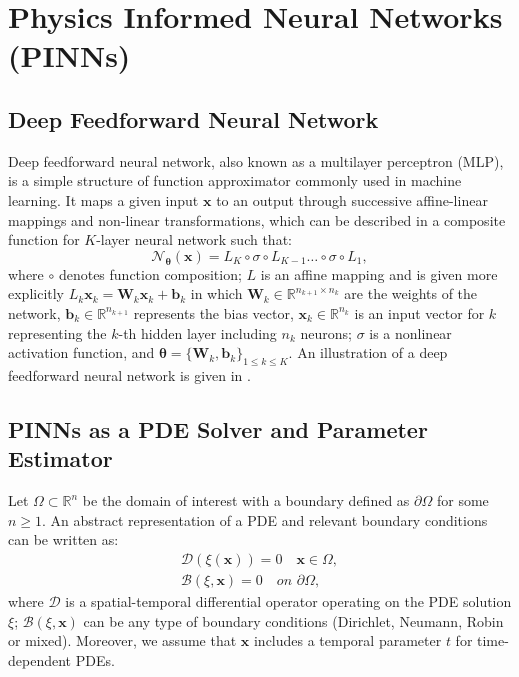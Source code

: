 \section{Physics Informed Neural Networks (PINNs)}
\label{sec:pinn}
\subsection{Deep Feedforward Neural Network}

Deep feedforward neural network, also known as a multilayer perceptron (MLP), is a simple structure of function approximator commonly used in machine learning. It maps a given input $\mathbf{x}$ to an output through successive affine-linear mappings and non-linear transformations, which can be described in a composite function for $K$-layer neural network such that:
\begin{equation}
    \label{eqn:k_layer_nn}
    \mathcal{N_{\mathbf{\boldsymbol\theta}}}(\mathbf{x})=L_K\circ\sigma\circ L_{K-1}\dots\circ\sigma\circ L_1,
\end{equation}
where $\circ$ denotes function composition; $L$ is an affine mapping and is given more explicitly $L_k\mathbf{x}_k=\mathbf{W}_k\mathbf{x}_k+\mathbf{b}_k$ in which $\mathbf{W}_k \in \mathbb{R}^{n_{k+1}\times n_{k}}$ are the weights of the network, $\mathbf{b}_k \in \mathbb{R}^{n_{k+1}}$ represents the bias vector, $\mathbf{x}_k \in \mathbb{R}^{n_{k}}$ is an input vector for $k$ representing the $k$-th hidden layer including $n_k$ neurons; $\sigma$ is a nonlinear activation function, and $\mathbf{\boldsymbol\theta}=\big\{\mathbf{W}_k,\mathbf{b}_k  \big\}_{1 \le k \le K}$. An illustration of a deep feedforward neural network is given in . 

\subsection{PINNs as a PDE Solver and Parameter Estimator}

Let $\Omega \subset \mathbb{R}^{n}$ be the domain of interest with a boundary defined as $\partial \Omega$ for some $n \geq 1$. An abstract representation of a PDE and relevant boundary conditions can be written as:
\begin{equation}
\label{eqn:abstract_pde}
\begin{split}
     \mathcal{D}(\xi(\mathbf{x}))=0 \quad \mathbf{x} \in \Omega, \\ \mathcal{B}(\xi,\mathbf{x})=0 \quad on \,\, \partial \Omega,
\end{split}
\end{equation}
where $\mathcal{D}$ is a spatial-temporal differential operator operating on the PDE solution $\xi$; $\mathcal{B}(\xi,\mathbf{x})$ can be any type of boundary conditions (Dirichlet, Neumann, Robin or mixed). Moreover, we assume that $\mathbf{x}$ includes a temporal parameter $t$ for time-dependent PDEs.

